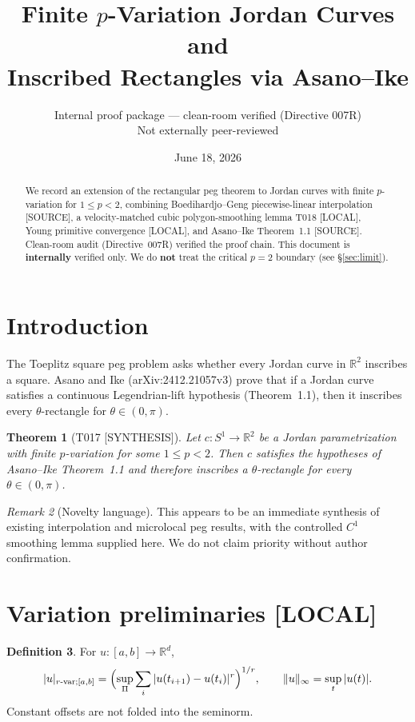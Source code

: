 \documentclass[11pt]{article}
\title{Finite $p$-Variation Jordan Curves and\\ Inscribed Rectangles via Asano--Ike}
\author{Internal proof package --- clean-room verified (Directive 007R)\\Not externally peer-reviewed}
\date{June 18, 2026}
\newtheorem{theorem}{Theorem}[section]
\theoremstyle{definition}
\newtheorem{definition}[theorem]{Definition}
\theoremstyle{remark}
\newtheorem{remark}[theorem]{Remark}
\newcommand{\tagsource}{\textsf{\footnotesize[SOURCE]}}
\newcommand{\taglocal}{\textsf{\footnotesize[LOCAL]}}
\newcommand{\tagsynth}{\textsf{\footnotesize[SYNTHESIS]}}
\begin{document}
\maketitle

\begin{abstract}
We record an extension of the rectangular peg theorem to Jordan curves
with finite $p$-variation for $1\le p<2$, combining Boedihardjo--Geng
piecewise-linear interpolation \tagsource, a velocity-matched cubic
polygon-smoothing lemma T018 \taglocal, Young primitive convergence
\taglocal, and Asano--Ike Theorem~1.1 \tagsource.
Clean-room audit (Directive~007R) verified the proof chain.
This document is \textbf{internally} verified only.
We do \textbf{not} treat the critical $p=2$ boundary (see \S\ref{sec:limit}).
\end{abstract}

\section{Introduction}

The Toeplitz square peg problem asks whether every Jordan curve in $\mathbb{R}^2$
inscribes a square. Asano and Ike (arXiv:2412.21057v3) prove that if a Jordan curve
satisfies a continuous Legendrian-lift hypothesis (Theorem~1.1), then it inscribes
every $\theta$-rectangle for $\theta\in(0,\pi)$.

\begin{theorem}[T017 \tagsynth]\label{thm:T017}
Let $c:S^1\to\mathbb{R}^2$ be a Jordan parametrization with finite $p$-variation
for some $1\le p<2$. Then $c$ satisfies the hypotheses of Asano--Ike Theorem~1.1
and therefore inscribes a $\theta$-rectangle for every $\theta\in(0,\pi)$.
\end{theorem}

\begin{remark}[Novelty language]
This appears to be an immediate synthesis of existing interpolation and microlocal
peg results, with the controlled $C^1$ smoothing lemma supplied here.
We do not claim priority without author confirmation.
\end{remark}

\section{Variation preliminaries \taglocal}

\begin{definition}
For $u:[a,b]\to\mathbb{R}^d$,
\[
|u|_{r\text{-var};[a,b]}
=\Bigl(\sup_{\Pi}\sum_i|u(t_{i+1})-u(t_i)|^r\Bigr)^{1/r},
\qquad
\|u\|_\infty=\sup_t|u(t)|.
\]
Constant offsets are not folded into the seminorm.
\end{definition}
\end{document}
